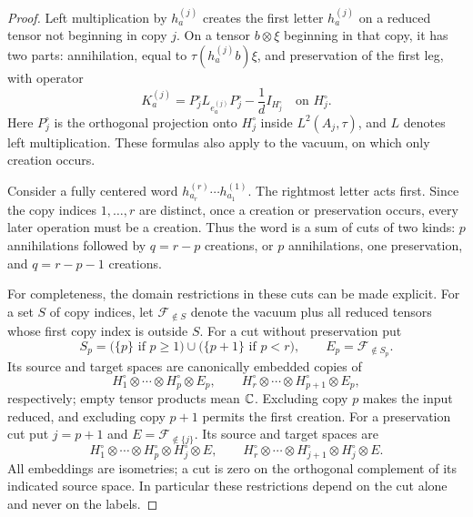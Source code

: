 \begin{proof}
Left multiplication by $h_a^{(j)}$ creates the first letter
$h_a^{(j)}$ on a reduced tensor not beginning in copy $j$.
On a tensor $b\otimes\xi$ beginning in that copy, it has two parts:
annihilation, equal to $\tau(h_a^{(j)}b)\xi$, and preservation of the
first leg, with operator
\begin{equation}\label{eq:fw-preservation-operator}
 K_a^{(j)}
 =P_j^\circ L_{e_a^{(j)}}P_j^\circ
       -\frac1d I_{H_j^\circ}
 \quad\text{on }H_j^\circ.
\end{equation}
Here $P_j^\circ$ is the orthogonal projection onto $H_j^\circ$ inside
$L^2(A_j,\tau)$, and $L$ denotes left multiplication.  These formulas
also apply to the vacuum, on which only creation occurs.

Consider a fully centered word
$h_{a_r}^{(r)}\cdots h_{a_1}^{(1)}$.  The rightmost letter acts first.
Since the copy indices $1,\ldots,r$ are distinct, once a creation or
preservation occurs, every later operation must be a creation.
Thus the word is a sum of cuts of two kinds: $p$ annihilations followed
by $q=r-p$ creations, or $p$ annihilations, one preservation, and
$q=r-p-1$ creations.

For completeness, the domain restrictions in these cuts can be made
explicit.  For a set $S$ of copy indices, let $\mathcal F_{\notin S}$
denote the vacuum plus all reduced tensors whose first copy index is
outside $S$.  For a cut without preservation put
\[
 S_p=\bigl(\{p\}\text{ if }p\geq1\bigr)
       \cup\bigl(\{p+1\}\text{ if }p<r\bigr),
 \qquad E_p=\mathcal F_{\notin S_p}.
\]
Its source and target spaces are canonically embedded copies of
\[
 H_1^\circ\otimes\cdots\otimes H_p^\circ\otimes E_p,
 \qquad
 H_r^\circ\otimes\cdots\otimes H_{p+1}^\circ\otimes E_p,
\]
respectively; empty tensor products mean $\mathbb C$.  Excluding copy $p$
makes the input reduced, and excluding copy $p+1$ permits the first
creation.  For a preservation cut put $j=p+1$ and
$E=\mathcal F_{\notin\{j\}}$.  Its source and target spaces are
\[
 H_1^\circ\otimes\cdots\otimes H_p^\circ\otimes H_j^\circ\otimes E,
 \qquad
 H_r^\circ\otimes\cdots\otimes H_{j+1}^\circ\otimes H_j^\circ\otimes E.
\]
All embeddings are isometries; a cut is zero on the orthogonal
complement of its indicated source space.  In particular these restrictions
depend on the cut alone and never on the labels.


\end{proof}
